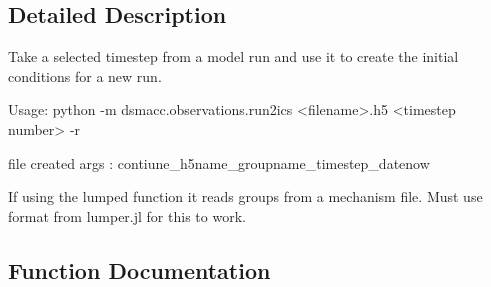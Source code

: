 \subsection{Detailed Description}
\begin{DoxyVerb}Take a selected timestep from a model run and use it to create the initial conditions for a new run.

Usage:
python -m dsmacc.observations.run2ics <filename>.h5 <timestep number> -r


file created args : contiune_h5name_groupname_timestep_datenow


If using the lumped function it reads groups from a mechanism file.
Must use format from lumper.jl for this to work.\end{DoxyVerb}
 

\subsection{Function Documentation}
\mbox{\label{namespacedsmacc_1_1observations_1_1run2ics_acf4b75327ea907f90e391080a9ce7fcc}} 
